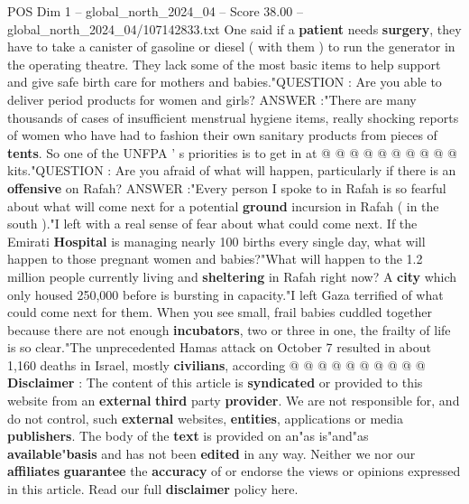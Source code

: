 \begin{textsample}{POS Dim 1 – global\_north\_2024\_04 – Score 38.00 – global\_north\_2024\_04/107142833.txt}
One said if a \textbf{patient} needs \textbf{surgery}, they have to take a canister of gasoline or diesel ( with them ) to run the generator in the operating theatre.
They lack some of the most basic items to help support and give safe birth care for mothers and babies."QUESTION : Are you able to deliver period products for women and girls?
ANSWER :"There are many thousands of cases of insufficient menstrual hygiene items, really shocking reports of women who have had to fashion their own sanitary products from pieces of \textbf{tents}.
So one of the UNFPA ' s priorities is to get in at @ @ @ @ @ @ @ @ @ @ kits."QUESTION : Are you afraid of what will happen, particularly if there is an \textbf{offensive} on Rafah?
ANSWER :"Every person I spoke to in Rafah is so fearful about what will come next for a potential \textbf{ground} incursion in Rafah ( in the south )."I left with a real sense of fear about what could come next.
If the Emirati \textbf{Hospital} is managing nearly 100 births every single day, what will happen to those pregnant women and babies?"What will happen to the 1.2 million people currently living and \textbf{sheltering} in Rafah right now?
A \textbf{city} which only housed 250,000 before is bursting in capacity."I left Gaza terrified of what could come next for them.
When you see small, frail babies cuddled together because there are not enough \textbf{incubators}, two or three in one, the frailty of life is so clear."The unprecedented Hamas attack on October 7 resulted in about 1,160 deaths in Israel, mostly \textbf{civilians}, according @ @ @ @ @ @ @ @ @ @ \textbf{Disclaimer} : The content of this article is \textbf{syndicated} or provided to this website from an \textbf{external} \textbf{third} party \textbf{provider}.
We are not responsible for, and do not control, such \textbf{external} websites, \textbf{entities}, applications or media \textbf{publishers}.
The body of the \textbf{text} is provided on an"as is"and"as \textbf{available}"\textbf{basis} and has not been \textbf{edited} in any way.
Neither we nor our \textbf{affiliates} \textbf{guarantee} the \textbf{accuracy} of or endorse the views or opinions expressed in this article.
Read our full \textbf{disclaimer} policy here.

\end{textsample}

